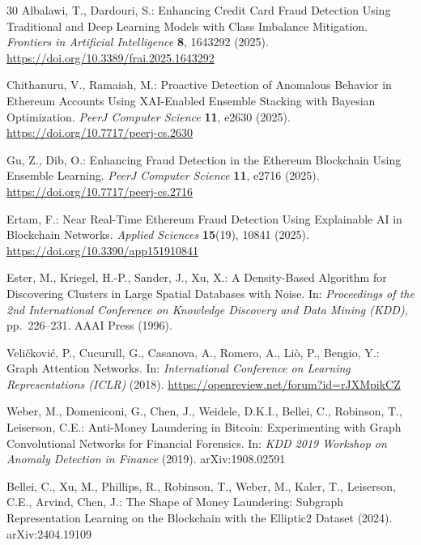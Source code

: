\documentclass[12pt,a4paper]{article}
\begin{document}
\begin{thebibliography}{30}
  Albalawi, T., Dardouri, S.:
  Enhancing Credit Card Fraud Detection Using Traditional
  and Deep Learning Models with Class Imbalance
  Mitigation.
  \textit{Frontiers in Artificial Intelligence} \textbf{8},
  1643292 (2025).
  \url{https://doi.org/10.3389/frai.2025.1643292}

  Chithanuru, V., Ramaiah, M.:
  Proactive Detection of Anomalous Behavior in Ethereum
  Accounts Using XAI-Enabled Ensemble Stacking with
  Bayesian Optimization.
  \textit{PeerJ Computer Science} \textbf{11}, e2630 (2025).
  \url{https://doi.org/10.7717/peerj-cs.2630}

  Gu, Z., Dib, O.:
  Enhancing Fraud Detection in the Ethereum Blockchain
  Using Ensemble Learning.
  \textit{PeerJ Computer Science} \textbf{11}, e2716 (2025).
  \url{https://doi.org/10.7717/peerj-cs.2716}

  Ertam, F.:
  Near Real-Time Ethereum Fraud Detection Using
  Explainable AI in Blockchain Networks.
  \textit{Applied Sciences} \textbf{15}(19), 10841 (2025).
  \url{https://doi.org/10.3390/app151910841}

  Ester, M., Kriegel, H.-P., Sander, J., Xu, X.:
  A Density-Based Algorithm for Discovering Clusters in
  Large Spatial Databases with Noise.
  In: \textit{Proceedings of the 2nd International
  Conference on Knowledge Discovery and Data Mining
  (KDD)}, pp.\ 226--231. AAAI Press (1996).

  Veli\v{c}kovi\'{c}, P., Cucurull, G., Casanova, A.,
  Romero, A., Li\`{o}, P., Bengio, Y.:
  Graph Attention Networks.
  In: \textit{International Conference on Learning
  Representations (ICLR)} (2018).
  \url{https://openreview.net/forum?id=rJXMpikCZ}

  Weber, M., Domeniconi, G., Chen, J., Weidele, D.K.I.,
  Bellei, C., Robinson, T., Leiserson, C.E.:
  Anti-Money Laundering in Bitcoin: Experimenting with
  Graph Convolutional Networks for Financial Forensics.
  In: \textit{KDD 2019 Workshop on Anomaly Detection in
  Finance} (2019).
  arXiv:1908.02591

  Bellei, C., Xu, M., Phillips, R., Robinson, T.,
  Weber, M., Kaler, T., Leiserson, C.E., Arvind,
  Chen, J.:
  The Shape of Money Laundering: Subgraph Representation
  Learning on the Blockchain with the Elliptic2
  Dataset (2024).
  arXiv:2404.19109

\end{thebibliography}
\end{document}
